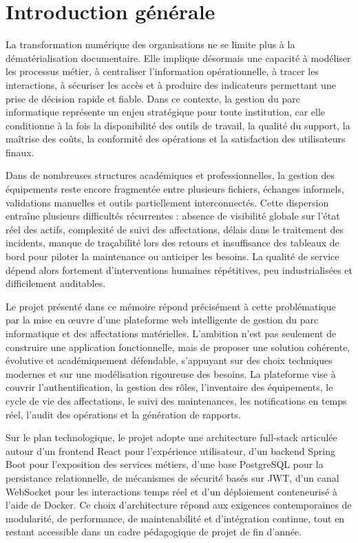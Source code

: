 ﻿\chapter*{Introduction générale}

La transformation numérique des organisations ne se limite plus à la dématérialisation documentaire. Elle implique désormais une capacité à modéliser les processus métier, à centraliser l'information opérationnelle, à tracer les interactions, à sécuriser les accès et à produire des indicateurs permettant une prise de décision rapide et fiable. Dans ce contexte, la gestion du parc informatique représente un enjeu stratégique pour toute institution, car elle conditionne à la fois la disponibilité des outils de travail, la qualité du support, la maîtrise des coûts, la conformité des opérations et la satisfaction des utilisateurs finaux.

Dans de nombreuses structures académiques et professionnelles, la gestion des équipements reste encore fragmentée entre plusieurs fichiers, échanges informels, validations manuelles et outils partiellement interconnectés. Cette dispersion entraîne plusieurs difficultés récurrentes : absence de visibilité globale sur l'état réel des actifs, complexité de suivi des affectations, délais dans le traitement des incidents, manque de traçabilité lors des retours et insuffisance des tableaux de bord pour piloter la maintenance ou anticiper les besoins. La qualité de service dépend alors fortement d'interventions humaines répétitives, peu industrialisées et difficilement auditables.

Le projet présenté dans ce mémoire répond précisément à cette problématique par la mise en œuvre d'une plateforme web intelligente de gestion du parc informatique et des affectations matérielles. L'ambition n'est pas seulement de construire une application fonctionnelle, mais de proposer une solution cohérente, évolutive et académiquement défendable, s'appuyant sur des choix techniques modernes et sur une modélisation rigoureuse des besoins. La plateforme vise à couvrir l'authentification, la gestion des rôles, l'inventaire des équipements, le cycle de vie des affectations, le suivi des maintenances, les notifications en temps réel, l'audit des opérations et la génération de rapports.

Sur le plan technologique, le projet adopte une architecture full-stack articulée autour d'un frontend React pour l'expérience utilisateur, d'un backend Spring Boot pour l'exposition des services métiers, d'une base PostgreSQL pour la persistance relationnelle, de mécanismes de sécurité basés sur JWT, d'un canal WebSocket pour les interactions temps réel et d'un déploiement conteneurisé à l'aide de Docker. Ce choix d'architecture répond aux exigences contemporaines de modularité, de performance, de maintenabilité et d'intégration continue, tout en restant accessible dans un cadre pédagogique de projet de fin d'année.

